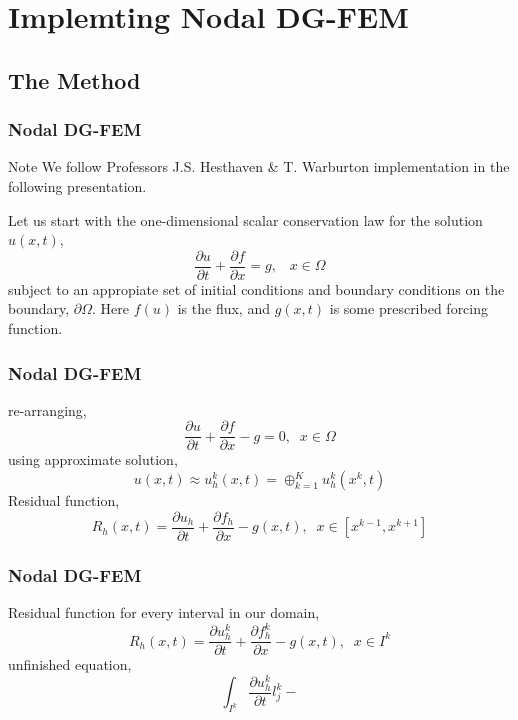 \section{Implemting Nodal DG-FEM}
\subsection{The Method}

\begin{frame}
  \frametitle{Nodal DG-FEM}
  \begin{block}{Note}
     We follow Professors J.S. Hesthaven \& T. Warburton implementation \cite{Hesthaven:2010:NDG:1952159} in the following presentation.
  \end{block}
  Let us start with the one-dimensional scalar conservation law for the solution $u(x,t)$,
  \begin{equation}
    \frac{\partial u}{\partial t} + \frac{\partial f}{\partial x} = g, \;\;\; x \in \Omega
  \end{equation}	
  subject to an appropiate set of initial conditions and boundary conditions on the boundary, $\partial \Omega$. Here $f(u)$ is the flux, and $g(x,t)$ is some prescribed forcing function.
\end{frame}

\begin{frame}
  \frametitle{Nodal DG-FEM}
  re-arranging,
  \begin{equation*}
   \frac{\partial u}{\partial t} + \frac{\partial f}{\partial x} - g = 0, \;\; x \in \Omega
  \end{equation*}
  using approximate solution,
  \begin{equation}
   u(x,t) \approx u^k_h(x,t) = \oplus^K_{k=1} u^k_h(x^k,t)
  \end{equation}
  Residual function,
  \begin{equation*}
   R_h(x,t) = \frac{\partial u_h}{\partial t} + \frac{\partial f_h}{\partial x} - g(x,t), \;\; x \in [x^{k-1},x^{k+1}]
  \end{equation*}
\end{frame}

\begin{frame}
  \frametitle{Nodal DG-FEM}
  Residual function for every interval in our domain,
  \begin{equation*}
   R_h(x,t) = \frac{\partial u^k_h}{\partial t} + \frac{\partial f^k_h}{\partial x} - g(x,t), \;\; x \in I^k
  \end{equation*}
  unfinished equation,
  \begin{equation}
  \int_{I^k} \frac{\partial u^k_h}{\partial t} l^k_j -  
  \end{equation}
\end{frame}


